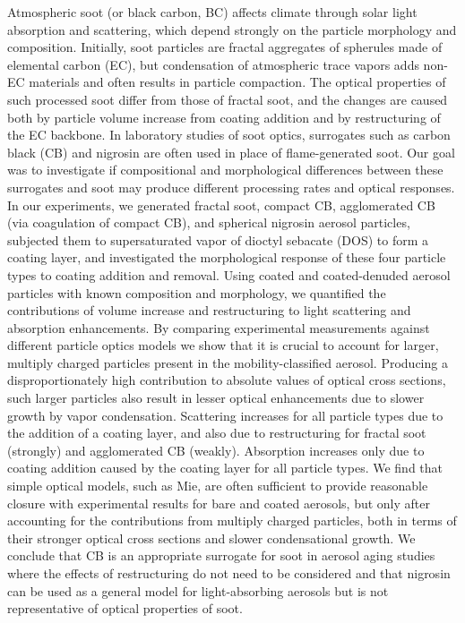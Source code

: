 Atmospheric soot (or black carbon, BC) affects climate through solar light absorption and scattering, which depend strongly on the particle morphology and composition. Initially, soot particles are fractal aggregates of spherules made of  elemental carbon (EC), but condensation of atmospheric trace vapors adds non-EC materials and often results in particle compaction. The optical properties of such processed soot differ from those of fractal soot, and the changes are caused both by particle volume increase from coating addition and by restructuring of the EC backbone. In laboratory studies of soot optics, surrogates such as carbon black (CB) and nigrosin are often used in place of flame-generated soot. Our goal was to investigate if compositional and morphological differences between these surrogates and soot may produce different processing rates and optical responses. In our experiments, we generated fractal soot, compact CB, agglomerated CB (via coagulation of compact CB), and spherical nigrosin aerosol particles, subjected them to supersaturated vapor of dioctyl sebacate (DOS) to form a coating layer, and investigated the morphological response of these four particle types to coating addition and removal. Using coated and coated-denuded aerosol particles with known composition and morphology, we quantified the contributions of volume increase and restructuring to light scattering and absorption enhancements. By comparing experimental measurements against different particle optics models we show that it is crucial to account for larger, multiply charged particles present in the mobility-classified aerosol. Producing a disproportionately high contribution to absolute values of optical cross sections, such larger particles also result in lesser optical enhancements due to slower growth by vapor condensation. Scattering increases for all particle types due to the addition of a coating layer, and also due to restructuring for fractal soot (strongly) and agglomerated CB (weakly). Absorption increases only due to coating addition caused by the coating layer for all particle types. We find that simple optical models, such as Mie, are often sufficient to provide reasonable closure with experimental results for bare and coated aerosols, but only after accounting for the contributions from multiply charged particles, both in terms of their stronger optical cross sections and slower condensational growth. We conclude that CB is an appropriate surrogate for soot in aerosol aging studies where the effects of restructuring do not need to be considered and that nigrosin can be used as a general model for light-absorbing aerosols but is not representative of optical properties of soot.
